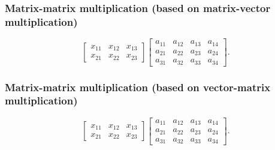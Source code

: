\begin{frame}
  \frametitle{Matrix-matrix multiplication (based on matrix-vector
    multiplication)}

  \[
  \begin{bmatrix}
    x_{11} & x_{12} & x_{13} \\
    x_{21} & x_{22} & x_{23}
  \end{bmatrix}
  \left[
  \begin{array}{c|c|c|c}
    a_{11} & a_{12} & a_{13} & a_{14} \\
    a_{21} & a_{22} & a_{23} & a_{24} \\
    a_{31} & a_{32} & a_{33} & a_{34}
  \end{array}
  \right].
  \]

  \vspace{2in}
\end{frame}

\begin{frame}
  \frametitle{Matrix-matrix multiplication (based on vector-matrix
    multiplication)}

  \[
  \left[
  \begin{array}{ccc}
    x_{11} & x_{12} & x_{13} \\
    \hline
    x_{21} & x_{22} & x_{23}
  \end{array}
  \right]
  \left[
  \begin{array}{cccc}
    a_{11} & a_{12} & a_{13} & a_{14} \\
    a_{21} & a_{22} & a_{23} & a_{24} \\
    a_{31} & a_{32} & a_{33} & a_{34}
  \end{array}
  \right].
  \]

  \vspace{2in}
\end{frame}

